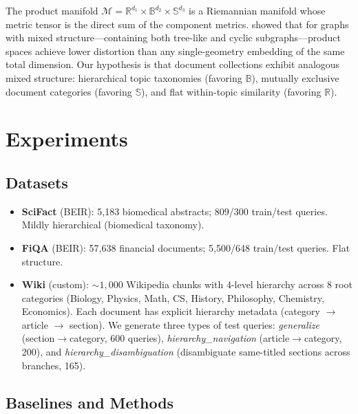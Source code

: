 \documentclass{article}
\begin{document}
The product manifold $\mathcal{M} = \mathbb{R}^{d_1}\!\times\!\mathbb{B}^{d_2}\!\times\!\mathbb{S}^{d_3}$ is a Riemannian manifold whose metric tensor is the direct sum of the component metrics. \citet{gu2019learning} showed that for graphs with mixed structure---containing both tree-like and cyclic subgraphs---product spaces achieve lower distortion than any single-geometry embedding of the same total dimension. Our hypothesis is that document collections exhibit analogous mixed structure: hierarchical topic taxonomies (favoring $\mathbb{B}$), mutually exclusive document categories (favoring $\mathbb{S}$), and flat within-topic similarity (favoring $\mathbb{R}$).

\section{Experiments}
\label{sec:experiments}

\subsection{Datasets}

\begin{itemize}[nosep,leftmargin=1.5em]
    \item \textbf{SciFact} (BEIR): 5,183 biomedical abstracts; 809/300 train/test queries. Mildly hierarchical (biomedical taxonomy).
    \item \textbf{FiQA} (BEIR): 57,638 financial documents; 5,500/648 train/test queries. Flat structure.
    \item \textbf{Wiki} (custom): ${\sim}1{,}000$ Wikipedia chunks with 4-level hierarchy across 8 root categories (Biology, Physics, Math, CS, History, Philosophy, Chemistry, Economics). Each document has explicit hierarchy metadata (category $\to$ article $\to$ section). We generate three types of test queries: \emph{generalize} (section$\to$category, 600 queries), \emph{hierarchy\_navigation} (article$\to$category, 200), and \emph{hierarchy\_disambiguation} (disambiguate same-titled sections across branches, 165).
\end{itemize}

\subsection{Baselines and Methods}
\end{document}
